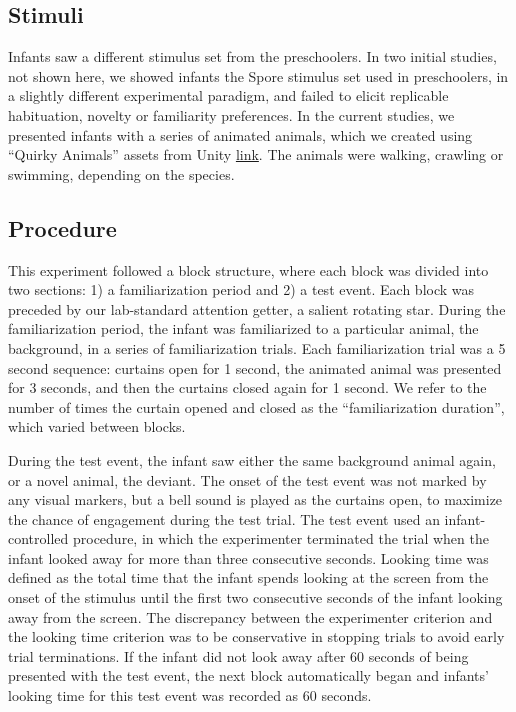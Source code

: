 \documentclass[10pt, letterpaper]{article}
\begin{document}
\hypertarget{stimuli-1}{%
\subsection{Stimuli}\label{stimuli-1}}

Infants saw a different stimulus set from the preschoolers. In two
initial studies, not shown here, we showed infants the Spore stimulus
set used in preschoolers, in a slightly different experimental paradigm,
and failed to elicit replicable habituation, novelty or familiarity
preferences. In the current studies, we presented infants with a series
of animated animals, which we created using ``Quirky Animals'' assets
from Unity \href{https://tinyurl.com/469xxrn7}{link}. The animals were
walking, crawling or swimming, depending on the species.

\hypertarget{procedure}{%
\subsection{Procedure}\label{procedure}}

This experiment followed a block structure, where each block was divided
into two sections: 1) a familiarization period and 2) a test event. Each
block was preceded by our lab-standard attention getter, a salient
rotating star. During the familiarization period, the infant was
familiarized to a particular animal, the background, in a series of
familiarization trials. Each familiarization trial was a 5 second
sequence: curtains open for 1 second, the animated animal was presented
for 3 seconds, and then the curtains closed again for 1 second. We refer
to the number of times the curtain opened and closed as the
``familiarization duration'', which varied between blocks.

During the test event, the infant saw either the same background animal
again, or a novel animal, the deviant. The onset of the test event was
not marked by any visual markers, but a bell sound is played as the
curtains open, to maximize the chance of engagement during the test
trial. The test event used an infant-controlled procedure, in which the
experimenter terminated the trial when the infant looked away for more
than three consecutive seconds. Looking time was defined as the total
time that the infant spends looking at the screen from the onset of the
stimulus until the first two consecutive seconds of the infant looking
away from the screen. The discrepancy between the experimenter criterion
and the looking time criterion was to be conservative in stopping trials
to avoid early trial terminations. If the infant did not look away after
60 seconds of being presented with the test event, the next block
automatically began and infants' looking time for this test event was
recorded as 60 seconds.
\end{document}
